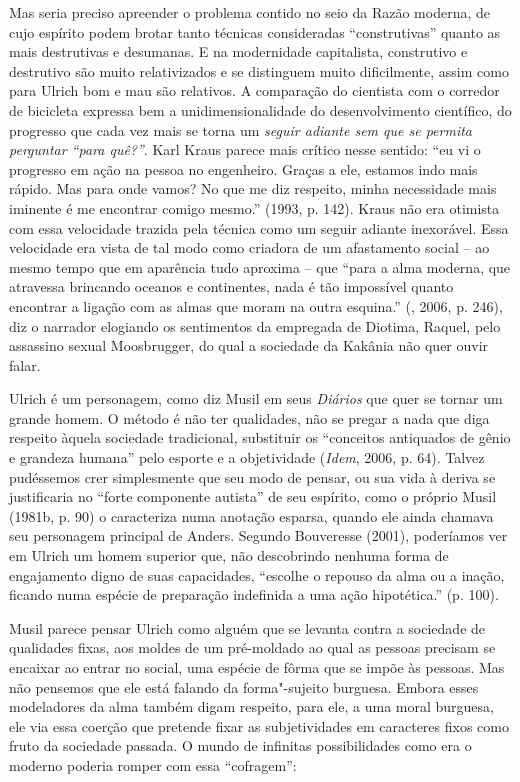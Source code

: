 Mas seria preciso apreender o problema contido no seio da Razão moderna,
de cujo espírito podem brotar tanto técnicas consideradas
``construtivas'' quanto as mais destrutivas e desumanas. E na
modernidade capitalista, construtivo e destrutivo são muito
relativizados e se distinguem muito dificilmente, assim como para Ulrich
bom e mau são relativos. A comparação do cientista com o corredor de
bicicleta expressa bem a unidimensionalidade do desenvolvimento
científico, do progresso que cada vez mais se torna um \emph{seguir
adiante sem que se permita perguntar ``para quê?''}. Karl Kraus parece
mais crítico nesse sentido: ``eu vi o progresso em ação na pessoa no
engenheiro. Graças a ele, estamos indo mais rápido. Mas para onde vamos?
No que me diz respeito, minha necessidade mais iminente é me encontrar
comigo mesmo.'' (1993, p. 142). Kraus não era otimista com essa
velocidade trazida pela técnica como um seguir adiante inexorável. Essa
velocidade era vista de tal modo como criadora de um afastamento social
-- ao mesmo tempo que em aparência tudo aproxima -- que ``para a alma
moderna, que atravessa brincando oceanos e continentes, nada é tão
impossível quanto encontrar a ligação com as almas que moram na outra
esquina.'' (, 2006, p. 246), diz o narrador elogiando os
sentimentos da empregada de Diotima, Raquel, pelo assassino sexual
Moosbrugger, do qual a sociedade da Kakânia não quer ouvir falar.

Ulrich é um personagem, como diz Musil em seus \emph{Diários} que quer
se tornar um grande homem. O método é não ter qualidades, não se pregar
a nada que diga respeito àquela sociedade tradicional, substituir os
``conceitos antiquados de gênio e grandeza humana'' pelo esporte e a
objetividade (\emph{Idem}, 2006, p. 64). Talvez pudéssemos crer simplesmente
que seu modo de pensar, ou sua vida à deriva se justificaria no ``forte
componente autista'' de seu espírito, como o próprio Musil (1981b, p.
90) o caracteriza numa anotação esparsa, quando ele ainda chamava seu
personagem principal de Anders. Segundo Bouveresse (2001), poderíamos
ver em Ulrich um homem superior que, não descobrindo nenhuma forma de
engajamento digno de suas capacidades, ``escolhe o repouso da alma ou a
inação, ficando numa espécie de preparação indefinida a uma ação
hipotética.'' (p. 100).

Musil parece pensar Ulrich como alguém que se levanta contra a sociedade
de qualidades fixas, aos moldes de um pré-moldado ao qual as pessoas
precisam se encaixar ao entrar no social, uma espécie de fôrma que se
impõe às pessoas. Mas não pensemos que ele está falando da forma"-sujeito
burguesa. Embora esses modeladores da alma também digam respeito, para
ele, a uma moral burguesa, ele via essa coerção que pretende fixar as
subjetividades em caracteres fixos como fruto da sociedade passada. O
mundo de infinitas possibilidades como era o moderno poderia romper com
essa ``cofragem'':

